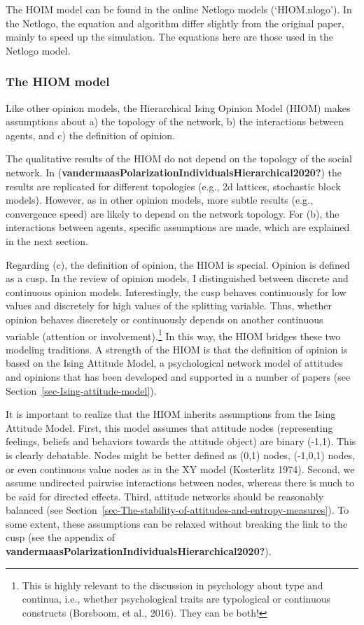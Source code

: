 \documentclass[
  a4paper,
  DIV=11,
  numbers=noendperiod,
  oneside]{scrreprt}
\begin{document}
The HOIM model can be found in the online Netlogo models (`HIOM.nlogo').
In the Netlogo, the equation and algorithm differ slightly from the
original paper, mainly to speed up the simulation. The equations here
are those used in the Netlogo model.

\hypertarget{sec-The-HIOM-model}{%
\subsubsection{The HIOM model}\label{sec-The-HIOM-model}}

Like other opinion models, the Hierarchical Ising Opinion Model (HIOM)
makes assumptions about a) the topology of the network, b) the
interactions between agents, and c) the definition of opinion.

The qualitative results of the HIOM do not depend on the topology of the
social network. In
(\textbf{vandermaasPolarizationIndividualsHierarchical2020?}) the
results are replicated for different topologies (e.g., 2d lattices,
stochastic block models). However, as in other opinion models, more
subtle results (e.g., convergence speed) are likely to depend on the
network topology. For (b), the interactions between agents, specific
assumptions are made, which are explained in the next section.

Regarding (c), the definition of opinion, the HIOM is special. Opinion
is defined as a cusp. In the review of opinion models, I distinguished
between discrete and continuous opinion models. Interestingly, the cusp
behaves continuously for low values and discretely for high values of
the splitting variable. Thus, whether opinion behaves discretely or
continuously depends on another continuous variable (attention or
involvement).\footnote{This is highly relevant to the discussion in
  psychology about type and continua, i.e., whether psychological traits
  are typological or continuous constructs (Borsboom, et al., 2016).
  They can be both!} In this way, the HIOM bridges these two modeling
traditions. A strength of the HIOM is that the definition of opinion is
based on the Ising Attitude Model, a psychological network model of
attitudes and opinions that has been developed and supported in a number
of papers (see Section~\ref{sec-Ising-attitude-model}).

It is important to realize that the HIOM inherits assumptions from the
Ising Attitude Model. First, this model assumes that attitude nodes
(representing feelings, beliefs and behaviors towards the attitude
object) are binary (-1,1). This is clearly debatable. Nodes might be
better defined as (0,1) nodes, (-1,0,1) nodes, or even continuous value
nodes as in the XY model (Kosterlitz 1974). Second, we assume undirected
pairwise interactions between nodes, whereas there is much to be said
for directed effects. Third, attitude networks should be reasonably
balanced (see
Section~\ref{sec-The-stability-of-attitudes-and-entropy-measures}). To
some extent, these assumptions can be relaxed without breaking the link
to the cusp (see the appendix of
\textbf{vandermaasPolarizationIndividualsHierarchical2020?}).
\end{document}
